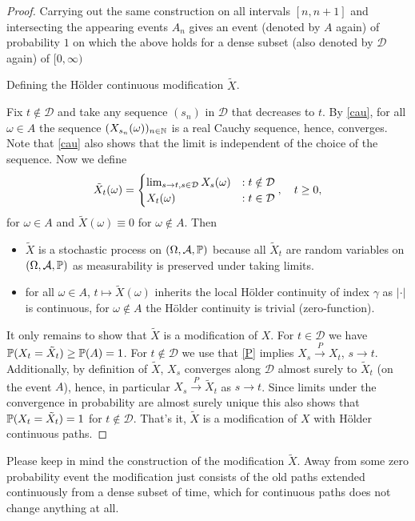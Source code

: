 \begin{proof}[Proof]
			Carrying out the same construction on all intervals $[n,n+1]$ and intersecting the appearing events $A_n$ gives an event (denoted by $A$ again) of probability $1$ on which the above holds for a dense subset (also denoted by $\mathcal D$ again) of $[0,\infty)$ 
\begin{lstep}
	Defining the H\"older continuous modification $\tilde X$.
\end{lstep}
 Fix $t\notin \mathcal D$ and take any sequence $(s_n)$ in $\mathcal D$ that decreases to $t$. By \eqref{cau}, for all $\omega\in A$ the sequence $(X_{s_n}(\omega))_{n\in \N}$ is a real Cauchy sequence, hence, converges. Note that \eqref{cau} also shows that the limit is independent of the choice of the sequence. Now we define
		\begin{align*}
			\tilde X_t(\omega)=
			\begin{cases}
				\lim_{s\to t, s\in \cD}X_{s}(\omega)&: t\notin \mathcal D\\
				X_t(\omega)&:  t\in \mathcal D
			\end{cases}, \quad t\geq 0,
		\end{align*}
		for $\omega \in A$ and $\tilde X(\omega)\equiv 0$ for $\omega\notin A$. Then
		\begin{itemize}
			\item $\tilde X$ is a stochastic process on $(\Omega, \mathcal A, \P)$ because all $\tilde X_t$ are random variables on $(\Omega, \mathcal A, \P)$ as measurability is preserved under taking limits.
			\item for all $\omega \in A$, $t\mapsto \tilde X(\omega)$ inherits the local H\"older continuity of index $\gamma$ as $|\cdot|$ is continuous, for $\omega \notin A$ the H\"older continuity is trivial (zero-function).
		\end{itemize}
		It only remains to show that $\tilde X$ is a modification of $X$. For $t\in \mathcal D$ we have $\P(X_t=\tilde X_t)\geq \P(A)=1$. For $t\notin \mathcal D$ we use that \eqref{P} implies  $X_s\overset{P}{\to} X_t$, $s\to t$. Additionally, by definition of $\tilde X$, $X_s$ converges along $\mathcal D$ almost surely to $\tilde X_t$ (on the event $A$), hence, in particular $X_s\overset{P}{\to} \tilde X_t$ as $s\to t$. Since limits under the convergence in probability are almost surely unique this also shows that $\P(X_t=\tilde X_t)=1$ for $t\notin \mathcal D$. That's it, $\tilde X$ is a modification of $X$ with H\"older continuous paths.
\end{proof}
Please keep in mind the construction of the modification $\tilde X$. Away from some zero probability event the modification just consists of the old paths extended continuously from a dense subset of time, which for continuous paths does not change anything at all.

